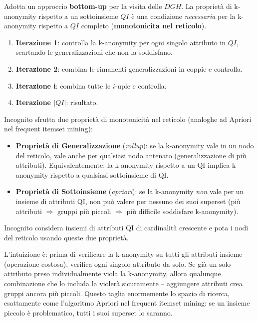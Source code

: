 \documentclass[a4paper,11pt]{article}
\begin{document}
\begin{definizione}
Adotta un approccio \textbf{bottom-up} per la visita delle $DGH$. La propriet\`{a} di k-anonymity rispetto a un sottoinsieme $QI$ \`{e} una condizione \emph{necessaria} per la k-anonymity rispetto a $QI$ completo (\textbf{monotonicita nel reticolo}).
\begin{enumerate}
  \item \textbf{Iterazione 1}: controlla la k-anonymity per ogni singolo attributo in $QI$, scartando le generalizzazioni che non la soddisfano.
  \item \textbf{Iterazione 2}: combina le rimanenti generalizzazioni in coppie e controlla.
  \item \textbf{Iterazione i}: combina tutte le $i$-uple e controlla.
  \item \textbf{Iterazione $|QI|$}: risultato.
\end{enumerate}

Incognito sfrutta due propriet\`{a} di monotonicità nel reticolo (analoghe ad Apriori nel frequent itemset mining):
\begin{itemize}
  \item \textbf{Propriet\`{a} di Generalizzazione} (\emph{rollup}): se la k-anonymity vale in un nodo del reticolo, vale anche per qualsiasi nodo antenato (generalizzazione di pi\`{u} attributi). Equivalentemente: la k-anonymity rispetto a un QI implica k-anonymity rispetto a qualsiasi sottoinsieme di QI.
  \item \textbf{Propriet\`{a} di Sottoinsieme} (\emph{apriori}): se la k-anonymity \emph{non} vale per un insieme di attributi QI, non pu\`{o} valere per nessuno dei suoi superset (pi\`{u} attributi $\Rightarrow$ gruppi pi\`{u} piccoli $\Rightarrow$ pi\`{u} difficile soddisfare k-anonymity).
\end{itemize}
Incognito considera insiemi di attributi QI di cardinalit\`{a} crescente e pota i nodi del reticolo usando queste due propriet\`{a}.
\end{definizione}

\begin{nota}
L'intuizione è: prima di verificare la k-anonymity su tutti gli attributi insieme (operazione costosa), verifica ogni singolo attributo da solo. Se già un solo attributo preso individualmente viola la k-anonymity, allora qualunque combinazione che lo includa la violerà sicuramente -- aggiungere attributi crea gruppi ancora più piccoli. Questo taglia enormemente lo spazio di ricerca, esattamente come l'algoritmo Apriori nel frequent itemset mining: se un insieme piccolo è problematico, tutti i suoi superset lo saranno.
\end{nota}
\end{document}
